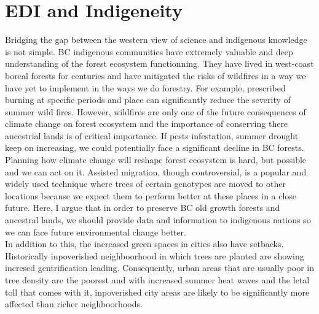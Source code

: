 \documentclass[11pt,letter]{article}
\begin{document}
\section *{EDI and Indigeneity}
Bridging the gap between the western view of science and indigenous knowledge is not simple. BC indigenous communities have extremely valuable and deep understanding of the forest ecosystem functionning. They have lived in west-coast boreal forests for centuries and have mitigated the risks of wildfires in a way we have yet to implement in the ways we do forestry. For example, prescribed burning at specific periods and place can significantly reduce the severity of summer wild fires. However, wildfires are only one of the future consequences of climate change on forest ecosystem and the importance of conserving there ancestrial lands is of critical importance. If pests infestation, summer drought keep on increasing, we could potentially face a significant decline in BC forests. Planning how climate change will reshape forest ecosystem is hard, but possible and we can act on it. Assisted migration, though controversial, is a popular and widely used technique where trees of certain genotypes are moved to other locations because we expect them to perform better at these places in a close future. Here, I argue that in order to preserve BC old growth forests and ancestral lands, we should provide data and information to indigenous nations so we can face future environmental change better.\\
In addition to this, the increased green spaces in cities also have setbacks. Historically inpoverished neighboorhood in which trees are planted are showing incresed gentrification leading. Consequently, urban areas that are usually poor in tree density are the poorest and with increased summer heat waves and the letal toll that comes with it, inpoverished city areas are likely to be significantly more affected than richer neighboorhoods. 

\end{document}
